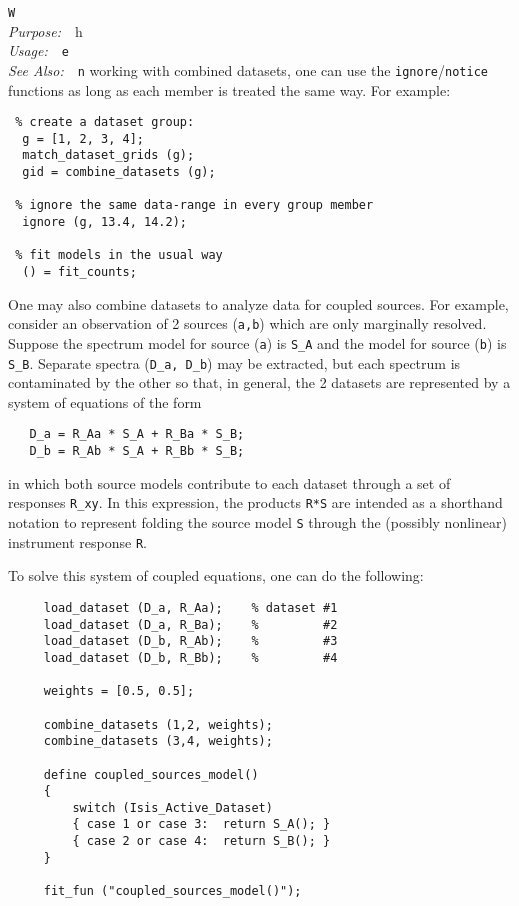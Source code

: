 \documentclass{book}
\makeatletter
\newif\ifpdf
\newenvironment{isisfunction}[4]%
{\index{{#1}@{\tt #1}}%
  \ifpdf
  \else
     \addcontentsline{toc}{subsection}{{#1} -- {#2}}
  \fi
  \vbox{
          \vspace*{\baselineskip}
          {\LARGE\tt #1}\vspace*{\baselineskip}\\
          {{\it Purpose:}~~{#2}}\\
          {{\it Usage:}~~{\tt #3}}\\
          {{\it See Also:}~~{\tt #4}}
       }
}%
{ }
\makeatother
\begin{document}
\begin{isisfunction}
When working with combined datasets, one can use the
\verb|ignore|/\verb|notice| functions as long as each member is
treated the same way.  For example:

\begin{verbatim}
 % create a dataset group:
  g = [1, 2, 3, 4];
  match_dataset_grids (g);
  gid = combine_datasets (g);

 % ignore the same data-range in every group member
  ignore (g, 13.4, 14.2);

 % fit models in the usual way
  () = fit_counts;
\end{verbatim}

One may also combine datasets to analyze data for coupled
sources.  For example, consider an observation of 2 sources
(\verb|a,b|) which are only marginally resolved.  Suppose the
spectrum model for source (\verb|a|) is \verb|S_A| and
the model for source (\verb|b|) is \verb|S_B|. Separate spectra
(\verb|D_a, D_b|) may be extracted, but each spectrum is
contaminated by the other so that, in general, the 2 datasets
are represented by a system of equations of the form
\begin{verbatim}
   D_a = R_Aa * S_A + R_Ba * S_B;
   D_b = R_Ab * S_A + R_Bb * S_B;
\end{verbatim}
in which both source models contribute to each dataset through
a set of responses \verb|R_xy|. In this expression, the
products \verb|R*S| are intended as a shorthand notation to
represent folding the source model \verb|S| through the
(possibly nonlinear) instrument response \verb|R|.

To solve this system of coupled equations, one can do the
following:

\begin{verbatim}
     load_dataset (D_a, R_Aa);    % dataset #1
     load_dataset (D_a, R_Ba);    %         #2
     load_dataset (D_b, R_Ab);    %         #3
     load_dataset (D_b, R_Bb);    %         #4

     weights = [0.5, 0.5];

     combine_datasets (1,2, weights);
     combine_datasets (3,4, weights);

     define coupled_sources_model()
     {
         switch (Isis_Active_Dataset)
         { case 1 or case 3:  return S_A(); }
         { case 2 or case 4:  return S_B(); }
     }

     fit_fun ("coupled_sources_model()");
\end{verbatim}


\end{isisfunction}
\end{document}
